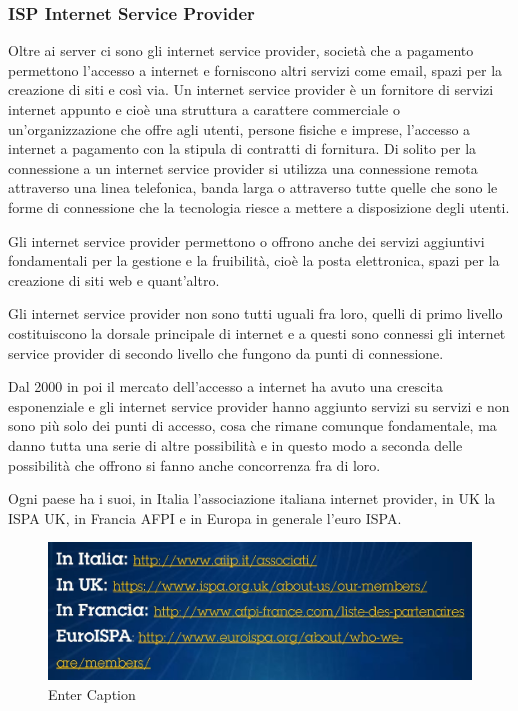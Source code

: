      \subsubsection{ISP Internet Service Provider}
     Oltre ai server ci sono gli internet service provider, società che a pagamento permettono l'accesso a internet e forniscono altri servizi come email, spazi per la creazione di siti e così via. Un internet service provider è un fornitore di servizi internet appunto e cioè una struttura a carattere commerciale o un'organizzazione che offre agli utenti, persone fisiche e imprese, l'accesso a internet a pagamento con la stipula di contratti di fornitura. Di solito per la connessione a un internet service provider si utilizza una connessione remota attraverso una linea telefonica, banda larga o attraverso tutte quelle che sono le forme di connessione che la tecnologia riesce a mettere a disposizione degli utenti. \par
     Gli internet service provider permettono o offrono anche dei servizi aggiuntivi fondamentali per la gestione e la fruibilità, cioè la posta elettronica, spazi per la creazione di siti web e quant'altro. \par
     Gli internet service provider non sono tutti uguali fra loro, quelli di primo livello costituiscono la dorsale principale di internet e a questi sono connessi gli internet service provider di secondo livello che fungono da punti di connessione.\par
     Dal 2000 in poi il mercato dell'accesso a internet ha avuto una crescita esponenziale e gli internet service provider hanno aggiunto servizi su servizi e non sono più solo dei punti di accesso, cosa che rimane comunque fondamentale, ma  danno tutta una serie di altre possibilità e in questo modo a seconda delle possibilità che offrono si fanno anche concorrenza fra di loro.\par
     Ogni paese ha i suoi, in Italia l'associazione italiana internet provider, in UK la ISPA UK, in Francia AFPI e in Europa in generale l'euro ISPA. \par
     
     \begin{figure}
         \centering
         \includegraphics[width=1\linewidth]{images/03_lez_fig_04.jpg}
         \caption{Enter Caption}
         \label{fig:enter-label}
     \end{figure}
     
